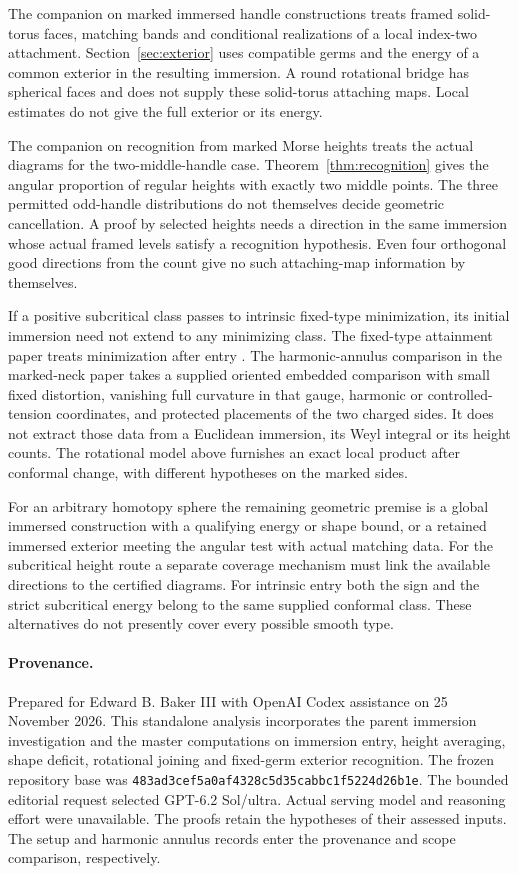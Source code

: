 \documentclass[11pt,letterpaper]{article}
\numberwithin{equation}{section}
\begin{document}
The companion on marked immersed handle constructions \cite{Baker2026ImmersedHandles}
treats framed solid-torus faces, matching bands and
conditional realizations of a local index-two attachment.
Section~\ref{sec:exterior} uses compatible germs and the energy
of a common exterior in the resulting immersion. A round
rotational bridge has spherical faces and does not supply
these solid-torus attaching maps. Local estimates do not give
the full exterior or its energy.

The companion on recognition from marked Morse heights \cite{Baker2026MarkedHeights}
treats the actual diagrams for the two-middle-handle
case. Theorem~\ref{thm:recognition} gives the angular proportion of
regular heights with exactly two middle points. The three permitted odd-handle
distributions do not themselves decide geometric cancellation.
A proof by selected heights needs a direction in the same
immersion whose actual framed levels satisfy a recognition
hypothesis. Even four orthogonal good directions from the
count give no such attaching-map information by themselves.

If a positive subcritical class passes to intrinsic fixed-type
minimization, its initial immersion need not extend to any
minimizing class. The fixed-type attainment paper treats minimization after entry
\cite{Baker2026BourAttainment}. The harmonic-annulus comparison in the marked-neck paper \cite{Baker2026MarkedNecks} takes a supplied oriented embedded comparison
with small fixed distortion, vanishing full curvature in that
gauge, harmonic or controlled-tension coordinates, and protected
placements of the two charged sides. It does not extract those
data from a Euclidean immersion, its Weyl integral or its height
counts. The rotational model above furnishes an exact local
product after conformal change, with different hypotheses on
the marked sides.

For an arbitrary homotopy sphere the remaining geometric
premise is a global immersed construction with a qualifying
energy or shape bound, or a retained immersed exterior meeting
the angular test with actual matching data. For the subcritical
height route a separate coverage mechanism must link the
available directions to the certified diagrams. For intrinsic
entry both the sign and the strict subcritical energy belong
to the same supplied conformal class. These alternatives do
not presently cover every possible smooth type.

\paragraph{Provenance.}
Prepared for Edward B. Baker III with OpenAI Codex assistance
on 25 November 2026. This standalone analysis incorporates the
parent immersion investigation and the master computations on
immersion entry, height averaging, shape deficit, rotational
joining and fixed-germ exterior recognition. The frozen
repository base was \texttt{483ad3cef5a0af4328c5d35cabbc1f5224d26b1e}.
The bounded editorial request selected GPT-6.2 Sol/ultra.
Actual serving model and reasoning effort were unavailable.
The proofs retain the hypotheses of their assessed inputs.
The setup and harmonic annulus records enter the provenance
and scope comparison, respectively.
\end{document}
